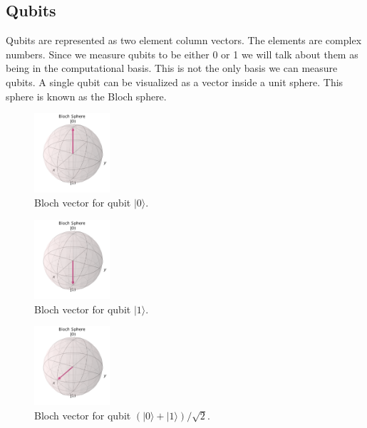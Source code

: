 \documentclass{article}
\newcommand{\ket}[1]{{\lvert #1 \rangle}}
\begin{document}
\subsection{Qubits}

Qubits are represented as two element column vectors. The elements are complex numbers. Since we measure qubits to be either 0 or 1 we will talk about them as being in the computational basis. This is not the only basis we can measure qubits. A single qubit can be visualized as a vector inside a unit sphere. This sphere is known as the Bloch sphere. 

\begin{figure}[H]
    \centering
    \includegraphics[width=0.25\textwidth]{bloch0.png}
    \caption{Bloch vector for qubit $\ket{0}$.}
\end{figure}

\begin{figure}[H]
    \centering
    \includegraphics[width=0.25\textwidth]{bloch1.png}
    \caption{Bloch vector for qubit $\ket{1}$.}
\end{figure}

\begin{figure}[H]
    \centering
    \includegraphics[width=0.25\textwidth]{superpos.png}
    \caption{Bloch vector for qubit $(\ket{0}+\ket{1})/\sqrt{2}$.}
\end{figure}
\end{document}
